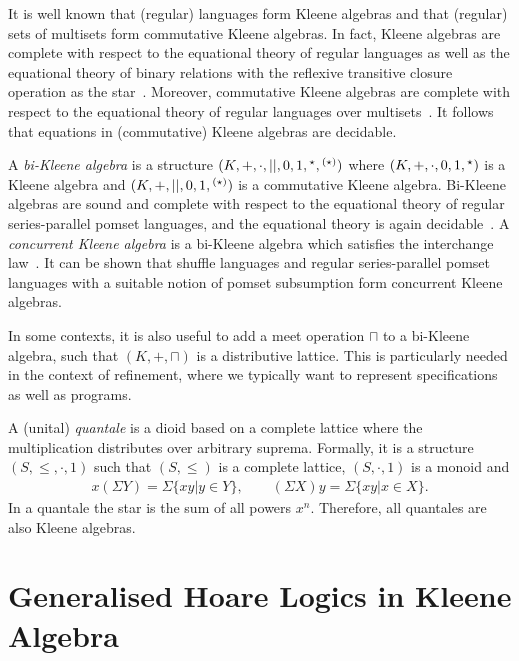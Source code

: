 \documentclass{llncs}
\begin{document}
It is well known that (regular) languages form Kleene algebras and
that (regular) sets of multisets form commutative Kleene algebras. In
fact, Kleene algebras are complete with respect to the equational
theory of regular languages as well as the equational theory of binary
relations with the reflexive transitive closure operation as the
star~\cite{kozen_completeness_1994}. Moreover, commutative Kleene
algebras are complete with respect to the equational theory of regular
languages over multisets~\cite{conway_regular_1971}. It follows that
equations in (commutative) Kleene algebras are decidable.

A \emph{bi-Kleene algebra} is a structure
$(K,+,\cdot,||,0,1,\hphantom{}^\star,\hphantom{}^{(\star)})$ where
$(K,+,\cdot,0,1,\hphantom{}^\star)$ is a Kleene algebra and
$(K,+,||,0,1,\hphantom{}^{(\star)})$ is a commutative Kleene
algebra. Bi-Kleene algebras are sound and complete with respect to the
equational theory of regular series-parallel pomset languages, and the
equational theory is again decidable~\cite{laurence_completeness_2013}. A
\emph{concurrent Kleene algebra} is a bi-Kleene algebra which
satisfies the interchange law~\cite{hoare_concurrent_2011}. It can be shown that
shuffle languages and regular series-parallel pomset languages with a
suitable notion of pomset subsumption form concurrent Kleene algebras.

In some contexts, it is also useful to add a meet operation $\sqcap$ to a bi-Kleene algebra,
such that $(K,+,\sqcap)$ is a distributive lattice. This is
particularly needed in the context of refinement, where we typically
want to represent specifications as well as programs.

A (unital) \emph{quantale} is a dioid based on a complete lattice
where the multiplication distributes over arbitrary suprema. Formally, it is a
structure $(S,\le,\cdot,1)$ such that $(S,\le)$ is a complete lattice,
$(S,\cdot,1)$ is a monoid and
\begin{align*}
x(\Sigma Y) = \Sigma\{xy|y\in Y\}, \qquad
(\Sigma X)y = \Sigma\{xy|x\in X\}.
\end{align*}
In a quantale the star is the sum of all powers $x^n$. Therefore, all
quantales are also Kleene algebras.


\section{Generalised Hoare Logics  in Kleene Algebra}
\end{document}
